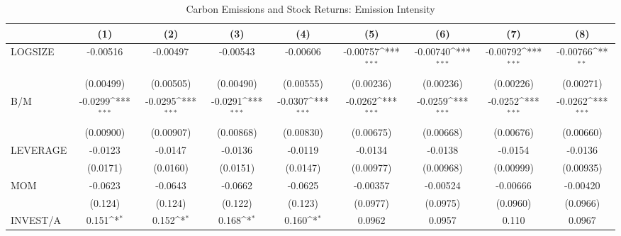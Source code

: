 \begin{table}[htbp]\centering
\def\sym#1{\ifmmode^{#1}\else\(^{#1}\)\fi}
\caption{Carbon Emissions and Stock Returns: Emission Intensity}
\begin{tabular}{l*{8}{c}}
\hline\hline
                    &\multicolumn{1}{c}{(1)}         &\multicolumn{1}{c}{(2)}         &\multicolumn{1}{c}{(3)}         &\multicolumn{1}{c}{(4)}         &\multicolumn{1}{c}{(5)}         &\multicolumn{1}{c}{(6)}         &\multicolumn{1}{c}{(7)}         &\multicolumn{1}{c}{(8)}         \\
\hline
LOGSIZE             &    -0.00516         &    -0.00497         &    -0.00543         &    -0.00606         &    -0.00757\sym{***}&    -0.00740\sym{***}&    -0.00792\sym{***}&    -0.00766\sym{**} \\
                    &   (0.00499)         &   (0.00505)         &   (0.00490)         &   (0.00555)         &   (0.00236)         &   (0.00236)         &   (0.00226)         &   (0.00271)         \\
B/M                 &     -0.0299\sym{***}&     -0.0295\sym{***}&     -0.0291\sym{***}&     -0.0307\sym{***}&     -0.0262\sym{***}&     -0.0259\sym{***}&     -0.0252\sym{***}&     -0.0262\sym{***}\\
                    &   (0.00900)         &   (0.00907)         &   (0.00868)         &   (0.00830)         &   (0.00675)         &   (0.00668)         &   (0.00676)         &   (0.00660)         \\
LEVERAGE            &     -0.0123         &     -0.0147         &     -0.0136         &     -0.0119         &     -0.0134         &     -0.0138         &     -0.0154         &     -0.0136         \\
                    &    (0.0171)         &    (0.0160)         &    (0.0151)         &    (0.0147)         &   (0.00977)         &   (0.00968)         &   (0.00999)         &   (0.00935)         \\
MOM                 &     -0.0623         &     -0.0643         &     -0.0662         &     -0.0625         &    -0.00357         &    -0.00524         &    -0.00666         &    -0.00420         \\
                    &     (0.124)         &     (0.124)         &     (0.122)         &     (0.123)         &    (0.0977)         &    (0.0975)         &    (0.0960)         &    (0.0966)         \\
INVEST/A            &       0.151\sym{*}  &       0.152\sym{*}  &       0.168\sym{*}  &       0.160\sym{*}  &      0.0962         &      0.0957         &       0.110         &      0.0967         \\

\end{tabular}
\end{table}
